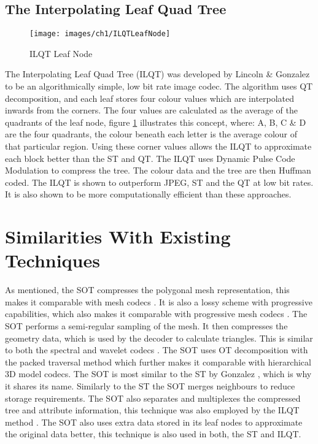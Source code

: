 \subsection{The Interpolating Leaf Quad Tree}

\begin{figure}[!h]
\centering
\texttt{[image: images/ch1/ILQTLeafNode]}
\caption{ILQT Leaf Node}
\label{ILQTLeafNode}
\end{figure}

The Interpolating Leaf Quad Tree (ILQT) was developed by Lincoln \& Gonzalez \cite{Lincoln13Interpolating} to be an algorithmically simple, low bit rate image codec. The algorithm uses QT decomposition, and each leaf stores four colour values which are interpolated inwards from the corners. The four values are calculated as the average of the quadrants of the leaf node, figure \ref{ILQTLeafNode} illustrates this concept, where: A, B, C \& D are the four quadrants, the colour beneath each letter is the average colour of that particular region. Using these corner values allows the ILQT to approximate each block better than the ST and QT. The ILQT uses Dynamic Pulse Code Modulation to compress the tree. The colour data and the tree are then Huffman coded. The ILQT is shown to outperform JPEG, ST and the QT \cite{Varma12Application} at low bit rates. It is also shown to be more computationally efficient than these approaches. 

\section{Similarities With Existing Techniques}

As mentioned, the SOT compresses the polygonal mesh representation, this makes it comparable with mesh codecs  \cite{Siddiqui07Octree,Deering95Geometry,touma98triangle,Alliez01Valence-Driven}. It is also a lossy scheme with progressive capabilities, which also makes it comparable with progressive mesh codecs \cite{Hoppe96Progressive, Alliez01Progressive,Yemez03Multilevel, Schnabel06Otree-based}. The SOT performs a semi-regular sampling of the mesh. It then compresses the geometry data, which is used by the decoder to calculate triangles. This is similar to both the spectral and wavelet codecs \cite{Karni00Spectral, Khodakovsky00Progressive}. The SOT uses OT decomposition with the packed traversal method which further makes it comparable with hierarchical 3D model codecs. The SOT is most similar to the ST by Gonzalez \cite{Gonzalez07ShadeTree}, which is why it shares its name. Similarly to the ST the SOT merges neighbours to reduce storage requirements. The SOT also separates and multiplexes the compressed tree and attribute information, this technique was also employed by the ILQT method \cite{Lincoln13Interpolating}. The SOT also uses extra data stored in its leaf nodes to approximate the original data better, this technique is also used in both, the ST and ILQT.

